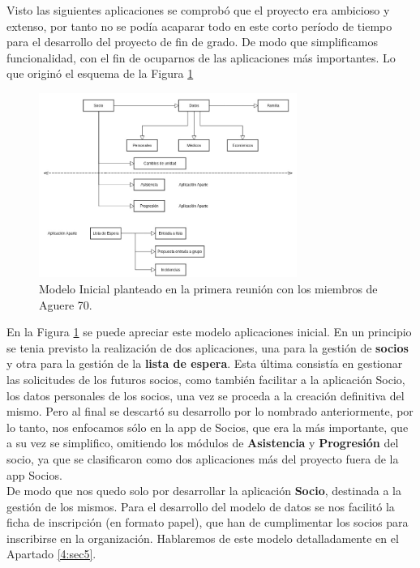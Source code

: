 Visto las siguientes aplicaciones se comprobó que el proyecto era ambicioso y extenso,
por tanto no se podía acaparar todo en este corto período de tiempo para el desarrollo del proyecto de fin de grado. De modo que simplificamos funcionalidad,
con el fin de ocuparnos de las aplicaciones más importantes. Lo que originó el esquema de la Figura \ref{fig:modelo_inicial}


\begin{figure}[H]
\begin{center}
\includegraphics[width=0.75\textwidth]{images/modelo_inicial.jpg}
\caption{Modelo Inicial planteado en la primera reunión con los miembros de Aguere 70.}
\label{fig:modelo_inicial}
\end{center}
\end{figure}

En la Figura \ref{fig:modelo_inicial} se puede apreciar este modelo aplicaciones inicial. En un principio se tenia previsto la realización de dos aplicaciones, 
una para la gestión de \textbf{socios} y otra para la gestión de la \textbf{lista de espera}. Esta última consistía en gestionar las solicitudes de los
futuros socios, como también facilitar a la aplicación Socio, los datos personales de los socios, una vez se proceda a la creación definitiva del mismo.
Pero al final se descartó su desarrollo por lo nombrado anteriormente, por lo tanto, nos enfocamos sólo en la app de Socios, que era la más importante, 
que a su vez se simplifico, omitiendo los módulos de \textbf{Asistencia} y \textbf{Progresión} del socio, ya que se clasificaron como dos aplicaciones más del proyecto fuera de la app Socios.\\

De modo que nos quedo solo por desarrollar la aplicación \textbf{Socio}, destinada a la gestión de los mismos. Para el desarrollo del modelo de datos se nos facilitó
la ficha de inscripción (en formato papel), que han de cumplimentar los socios para inscribirse en la organización. Hablaremos de este modelo detalladamente en el Apartado \ref{4:sec5}.


